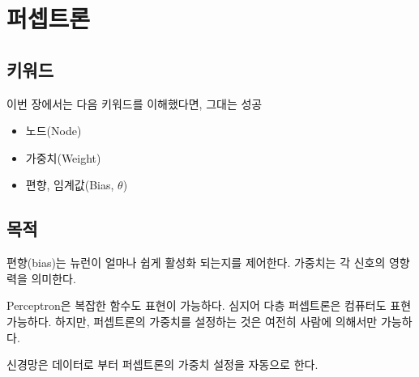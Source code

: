 	\clearpage
	\section{퍼셉트론}
	
	\subsection{키워드}
	이번 장에서는 다음 키워드를 이해했다면, 그대는 성공~
	\begin{itemize}
		\item 노드(Node)
		\item 가중치(Weight)
		\item 편향, 임계값(Bias, $\theta$)
	\end{itemize}
	
	\subsection{목적}
	
	편향(bias)는 뉴런이 얼마나 쉽게 활성화 되는지를 제어한다.
	가중치는 각 신호의 영향력을 의미한다.
	
	
	Perceptron은 복잡한 함수도 표현이 가능하다. 심지어 다층 퍼셉트론은 컴퓨터도 표현 가능하다.
	하지만, 퍼셉트론의 가중치를 설정하는 것은 여전히 사람에 의해서만 가능하다.
	
	신경망은 데이터로 부터 퍼셉트론의 가중치 설정을 자동으로 한다.
	